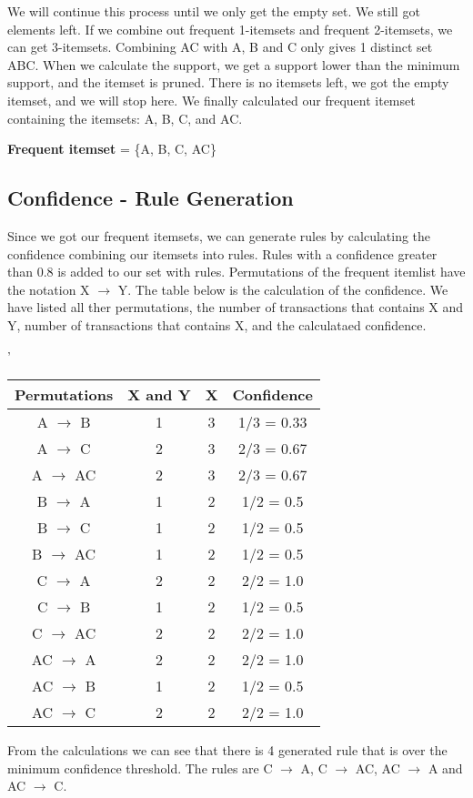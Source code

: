 	We will continue this process until we only get the empty set. We still got elements
	left. If we combine out frequent 1-itemsets and frequent 2-itemsets, we can get
	3-itemsets. Combining AC with A, B and C only gives 1 distinct set ABC. When we calculate
	the support, we get a support lower than the minimum support, and the itemset is pruned. 
	There is no itemsets left, we got the empty itemset, and we will stop here. We finally
	calculated our frequent itemset containing the itemsets: A, B, C, and AC.

	{\bf Frequent itemset} = \{A, B, C, AC\}
	
	\subsection*{Confidence - Rule Generation}

	Since we got our frequent itemsets, we can generate rules by calculating the confidence
	combining our itemsets into rules. Rules with a confidence greater than 0.8 is added to
	our set with rules. Permutations of the frequent itemlist have the notation X $\rightarrow$
	Y. The table below is the calculation of the confidence. We have listed all ther permutations,
	the number of transactions that contains X and Y, number of transactions that contains X, and
	the calculataed confidence. 

		\begin{table}[H]'
		\centering
			\begin{tabular}{ c | c | c | c }
				\hline
				Permutations & X and Y & X & Confidence \\ \hline
				A $\rightarrow$ B & 1 & 3 & {\color{red} 1/3 = 0.33} \\ 
				A $\rightarrow$ C & 2 & 3 & {\color{red} 2/3 = 0.67} \\ 
				A $\rightarrow$ AC & 2 & 3 & {\color{red} 2/3 = 0.67} \\ 
				B $\rightarrow$ A & 1 & 2 & {\color{red} 1/2 = 0.5} \\ 
				B $\rightarrow$ C & 1 & 2 & {\color{red} 1/2 = 0.5} \\ 
				B $\rightarrow$ AC & 1 & 2 & {\color{red} 1/2 = 0.5} \\ 
				C $\rightarrow$ A & 2 & 2 & 2/2 = 1.0 \\ 
				C $\rightarrow$ B & 1 & 2 & {\color{red} 1/2 = 0.5} \\
				C $\rightarrow$ AC & 2 & 2 & 2/2 = 1.0 \\
				AC $\rightarrow$ A & 2 & 2 & 2/2 = 1.0 \\
				AC $\rightarrow$ B & 1 & 2 & {\color{red} 1/2 = 0.5} \\
				AC $\rightarrow$ C & 2 & 2 & 2/2 = 1.0 \\ \hline
			\end{tabular}
		\end{table}

	From the calculations we can see that there is 4 generated rule that is over the minimum
	confidence threshold. The rules are C $\rightarrow$ A, C $\rightarrow$ AC, AC $\rightarrow$ A and
	AC $\rightarrow$ C.


	

